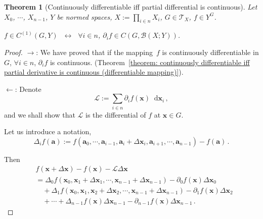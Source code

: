 \documentclass[openany]{book}
\theoremstyle{plain}
\newtheorem{theorem}{Theorem}[section] %
\theoremstyle{definition}
\newcommand{\dif}{\mathop{}\!\mathrm{d}} %
\newcommand*{\bv}{\boldsymbol} %
\newcommand*{\IFF}{\;\leftrightarrow\;} %
\begin{document}
\begin{theorem}[Continuously differentiable iff partial differential is continuous]
	\label{theorem: continuously differentiable iff partial differential is continuous}
	Let $X_0$, $\cdots$, $X_{n-1}$, $Y$ be normed spaces, $X := \prod_{i \in n} X_i$, $G \in \mathscr T_X$, $f \in Y^G$.

	$f \in C^{(1)}(G, Y)$ $\IFF$ $\forall i \in n$, $\partial_i f \in C(G, \mathcal B(X; Y))$.
\end{theorem}
\begin{proof}
	$\to$: 
	We have proved that if the mapping~$f$ is continuously differentiable in $G$, $\forall i \in n$, $\partial_i f$ is continuous. (Theorem~\ref{theorem: continuously differentiable iff partial derivative is continuous (differentiable mapping)}).

	$\gets$:
	Denote
	\begin{equation*}
		\mathscr L := \sum_{i \in n} \partial_i f(\bv x) \dif \bv x_i\,,
	\end{equation*}
	and we shall show that $\mathscr L$ is the differential of $f$ at $\bv x \in G$.

	Let us introduce a notation, 
	\begin{equation*}
		\Delta_i f(\bv a) := f(\bv a_0, \cdots, \bv a_{i-1}, \bv a_i + \Delta \bv x_i, \bv a_{i+1}, \cdots, \bv a_{n-1}) - f(\bv a)\,.
	\end{equation*}

	Then
	\begin{align*}
		&f(\bv x + \Delta \bv x) - f(\bv x) - \mathscr L \Delta \bv x 
		\\
		&= \Delta_0 f(\bv x_0, \bv x_1 + \Delta \bv x_1, \cdots, \bv x_{n-1} + \Delta \bv x_{n-1}) - \partial_0 f(\bv x)\Delta \bv x_0
		\\
		&\quad + \Delta_1 f(\bv x_0, \bv x_1, \bv x_2 + \Delta \bv x_2, \cdots, \bv x_{n-1} + \Delta \bv x_{n-1}) 
			- \partial_1 f(\bv x) \Delta \bv x_2
		\\
		&\quad + \cdots 
		 + \Delta_{n-1} f(\bv x) \Delta \bv x_{n-1} - \partial_{n-1} f(\bv x) \Delta \bv x_{n-1}
		\,.
	\end{align*}


\end{proof}
\end{document}
